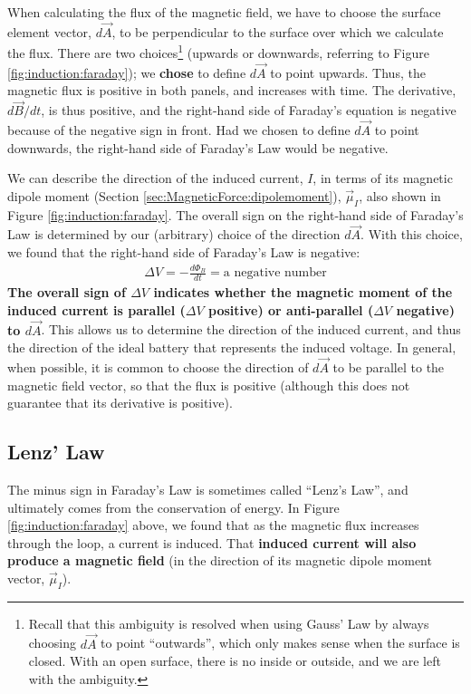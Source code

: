 When calculating the flux of the magnetic field, we have to choose the surface element vector, $d\vec A$, to be perpendicular to the surface over which we calculate the flux. There are two choices\footnote{Recall that this ambiguity is resolved when using Gauss' Law by always choosing $d\vec A$ to point ``outwards'', which only makes sense when the surface is closed. With an open surface, there is no inside or outside, and we are left with the ambiguity.} (upwards or downwards, referring to Figure \ref{fig:induction:faraday}); we \textbf{chose} to define $d\vec A$ to point upwards. Thus, the magnetic flux is positive in both panels, and increases with time. The derivative, $d\vec B/dt$, is thus positive, and the right-hand side of Faraday's equation is negative because of the negative sign in front. Had we chosen to define $d\vec A$ to point downwards, the right-hand side of Faraday's Law would be negative.

We can describe the direction of the induced current, $I$, in terms of its magnetic dipole moment (Section \ref{sec:MagneticForce:dipolemoment}), $\vec\mu_I$, also shown in Figure \ref{fig:induction:faraday}. The overall sign on the right-hand side of Faraday's Law is determined by our (arbitrary) choice of the direction $d\vec A$. With this choice, we found that the right-hand side of Faraday's Law is negative:
\begin{align*}
\Delta V = -\frac{d\Phi_B}{dt}=\text{a negative number}
\end{align*}
\textbf{The overall sign of $\Delta V$ indicates whether the magnetic moment of the induced current is parallel ($\Delta V$ positive) or anti-parallel ($\Delta V$ negative) to $d\vec A$}. This allows us to determine the direction of the induced current, and thus the direction of the ideal battery that represents the induced voltage. In general, when possible, it is common to choose the direction of $d\vec A$ to be parallel to the magnetic field vector, so that the flux is positive (although this does not guarantee that its derivative is positive).

\subsection{Lenz' Law}
The minus sign in Faraday's Law is sometimes called ``Lenz's Law'', and ultimately comes from the conservation of energy. In Figure \ref{fig:induction:faraday} above, we found that as the magnetic flux increases through the loop, a current is induced. That \textbf{induced current will also produce a magnetic field} (in the direction of its magnetic dipole moment vector, $\vec \mu_I$).

